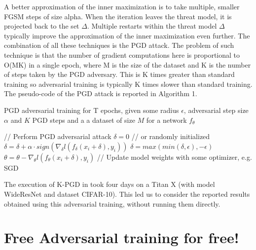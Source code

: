 \documentclass{article}
\begin{document}
A better approximation of the inner maximization is to take multiple, smaller FGSM steps of size alpha. When the iteration leaves the threat model, it is projected back to the set $\Delta$. Multiple restarts within the threat model $\Delta$ typically improve the approximation of the inner maximization even further. The combination of all these techniques is the PGD attack. The problem of such technique is that the number of gradient computations here is proportional to O(MK) in a single epoch, where M is the size of the dataset and K is the number of steps taken by the PGD adversary. This is K times greater than standard training so adversarial training is typically K times slower than standard training. The pseudo-code of the PGD attack is reported in Algorithm 1.
\begin{algorithm}[H]
	\caption{PGD adversarial training for T epochs, given some radius $\epsilon$, adversarial step size $\alpha$ and $K$ PGD steps and a a dataset of size $M$ for a network $f_{\theta}$}
	\begin{algorithmic}[1]
		\State// Perform PGD adversarial attack
		\State $\delta = 0$ // or randomly initialized
		\State $\delta = \delta + \alpha\cdot sign(\nabla_{\delta}l(f_{\delta}(x_i + \delta), y_i))$
		\State $\delta = max(min(\delta, \epsilon), -\epsilon)$
		\EndFor
		\State$\theta = \theta - \nabla_{\theta}l(f_{\theta}(x_i + \delta), y_i)$ // Update model weights with some optimizer, e.g. SGD
		\EndFor
		\EndFor
	\end{algorithmic}
\end{algorithm}
The execution of K-PGD in \cite{MadryEtAl2017} took four days on a Titan X (with model WideResNet and dataset CIFAR-10). This led us to consider the reported results obtained using this adversarial training, without running them directly.

\section{Free Adversarial training for free!}
\end{document}
